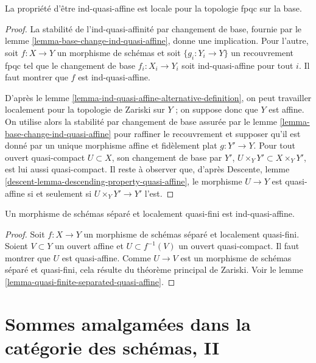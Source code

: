 \begin{lemma}
\label{lemma-descending-property-ind-quasi-affine}
La propriété d'être ind-quasi-affine est locale pour la topologie fpqc sur la base.
\end{lemma}

\begin{proof}
La stabilité de l'ind-quasi-affinité par changement de base,
fournie par le lemme \ref{lemma-base-change-ind-quasi-affine},
donne une implication. Pour l'autre, soit $f : X \to Y$
un morphisme de schémas et soit $\{g_i : Y_i \to Y\}$
un recouvrement fpqc tel que le changement de base $f_i : X_i \to Y_i$
soit ind-quasi-affine pour tout $i$. Il faut montrer que $f$ est ind-quasi-affine.

\medskip\noindent
D'après le lemme \ref{lemma-ind-quasi-affine-alternative-definition}, on peut travailler
localement pour la topologie de Zariski sur $Y$ ; on suppose donc que $Y$ est affine.
On utilise alors la stabilité par changement de base assurée par le
lemme \ref{lemma-base-change-ind-quasi-affine} pour raffiner le recouvrement
et supposer qu'il est donné par un unique morphisme affine et fidèlement plat
$g : Y' \to Y$. Pour tout ouvert quasi-compact $U \subset X$, son
changement de base par $Y'$, $U \times_Y Y' \subset X \times_Y Y'$, est lui aussi quasi-compact.
Il reste à observer que, d'après
Descente, lemme \ref{descent-lemma-descending-property-quasi-affine},
le morphisme $U \to Y$ est quasi-affine si et seulement si $U \times_Y Y' \to Y'$ l'est.
\end{proof}

\begin{lemma}
\label{lemma-etale-separated-ind-quasi-affine}
Un morphisme de schémas séparé et localement quasi-fini est ind-quasi-affine.
\end{lemma}

\begin{proof}
Soit $f : X \to Y$ un morphisme de schémas séparé et localement quasi-fini.
Soient $V \subset Y$ un ouvert affine et $U \subset f^{-1}(V)$ un ouvert
quasi-compact. Il faut montrer que $U$ est quasi-affine. Comme $U \to V$ est un
morphisme de schémas séparé et quasi-fini, cela résulte du
théorème principal de Zariski. Voir le
lemme \ref{lemma-quasi-finite-separated-quasi-affine}.
\end{proof}




\section{Sommes amalgamées dans la catégorie des schémas, II}
\label{section-pushouts-II}

